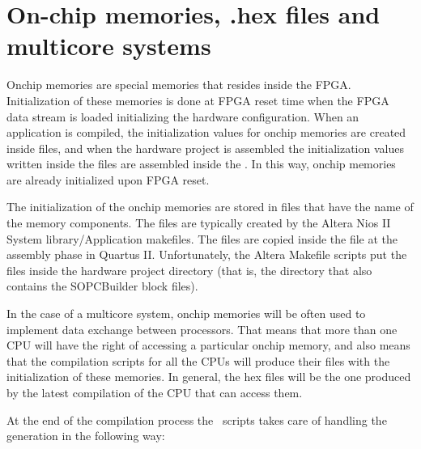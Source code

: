 \section{On-chip memories, .hex files and multicore systems}
\label{sec:hex-problem}

Onchip memories are special memories that resides inside the
FPGA. Initialization of these memories is done at FPGA reset time when
the FPGA data stream is loaded initializing the hardware
configuration.  When an application is compiled, the initialization
values for onchip memories are created inside  files, and
when the hardware project is assembled the initialization values
written inside the  files are assembled inside the
. In this way, onchip memories are already initialized upon
FPGA reset.

The initialization of the onchip memories are stored in 
files that have the name of the memory components. The 
files are typically created by the Altera Nios II System
library/Application makefiles. The  files are copied inside
the  file at the assembly phase in Quartus
II. Unfortunately, the Altera Makefile scripts put the 
files inside the hardware project directory (that is, the directory
that also contains the SOPCBuilder block files).

In the case of a multicore system, onchip memories will be often
used to implement data exchange between processors. That means that
more than one CPU will have the right of accessing a particular
onchip memory, and also means that the compilation scripts for all the
CPUs will produce their  files with the initialization of these
memories. In general, the hex files will be the one produced by the
latest compilation of the CPU that can access them.

At the end of the compilation process the \ee\ scripts takes care of
handling the  generation in the following way:

